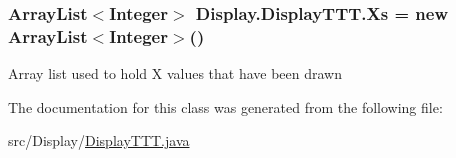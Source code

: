 \subsubsection[{Xs}]{\setlength{\rightskip}{0pt plus 5cm}Array\+List$<$Integer$>$ Display.\+Display\+T\+T\+T.\+Xs = new Array\+List$<$Integer$>$()\hspace{0.3cm}{\ttfamily [private]}}\label{class_display_1_1_display_t_t_t_a7dc4fccda99b958bd1dead1dc6543442}
Array list used to hold X values that have been drawn 

The documentation for this class was generated from the following file\+:\begin{DoxyCompactItemize}
\item 
src/\+Display/\hyperlink{_display_t_t_t_8java}{Display\+T\+T\+T.\+java}\end{DoxyCompactItemize}
